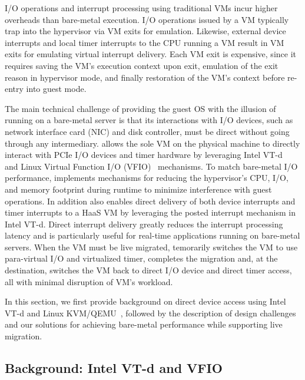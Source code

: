 I/O operations and interrupt processing using traditional VMs incur higher overheads than bare-metal execution. 
I/O operations issued by a VM typically trap into the hypervisor via VM exits for emulation.
Likewise, external device interrupts and local timer interrupts 
to the CPU running a VM result in VM exits for emulating virtual interrupt delivery.
Each VM exit is expensive, since it requires saving the VM's execution context upon exit,
emulation of the exit reason in hypervisor mode, 
and finally restoration of the VM's context before re-entry into guest mode.

The main technical challenge of providing the guest OS with the illusion of running on 
a bare-metal server is that its interactions with I/O devices, such as network 
interface card (NIC) and disk controller, must be direct without going through any intermediary.
\na allows the sole VM on the physical machine to directly interact with PCIe I/O devices and 
timer hardware by leveraging Intel VT-d~\cite{intelvtd-paper} and 
Linux Virtual Function I/O (VFIO)~\cite{vfio} mechanisms. 
To match bare-metal I/O performance, \na implements mechanisms 
for reducing the hypervisor's CPU, I/O, and memory 
footprint during runtime to minimize interference with guest operations.
In addition \na also enables direct delivery of both device interrupts
and timer interrupts to a HaaS VM by leveraging
the posted interrupt mechanism in Intel VT-d.
Direct interrupt delivery greatly reduces the interrupt processing latency and is
particularly useful for real-time applications running on bare-metal servers. 
When the VM must be live migrated, \na temorarily switches the VM to use
para-virtual I/O and virtualized timer, completes the migration
and, at the destination, switches the VM back to direct I/O device and direct 
timer access, all with minimal disruption of VM's workload.

In this section, we first  provide background on direct device access using 
Intel VT-d and Linux KVM/QEMU~\cite{kvm}, followed by the description of design challenges 
and our solutions for achieving bare-metal performance while supporting live migration.

\subsection{Background: Intel VT-d and VFIO}

